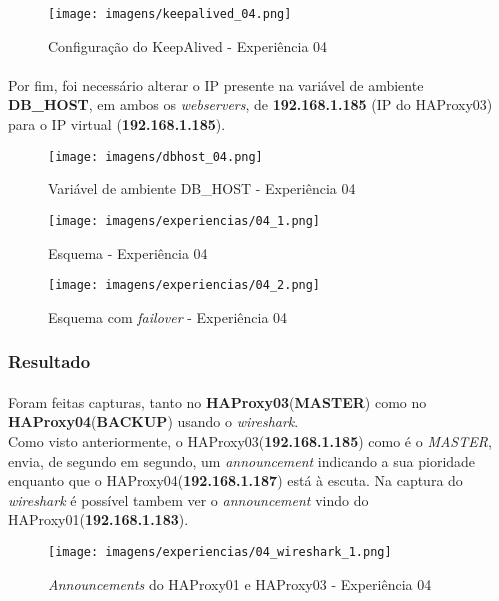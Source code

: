 \documentclass{report}
\begin{document}
\begin{figure}[H]
\center
\texttt{[image: imagens/keepalived\_04.png]}
\caption{Configuração do KeepAlived - Experiência 04}
\label{fig.nav}
\end{figure}


\paragraph{}
Por fim, foi necessário alterar o IP presente na variável de ambiente \textbf{DB\_HOST}, em ambos os \emph{webservers},
de \textbf{192.168.1.185} (IP do HAProxy03) para o IP virtual (\textbf{192.168.1.185}).

\begin{figure}[H]
\center
\texttt{[image: imagens/dbhost\_04.png]}
\caption{Variável de ambiente DB\_HOST - Experiência 04}
\label{fig.nav}
\end{figure}


\begin{figure}[H]
\center
\texttt{[image: imagens/experiencias/04\_1.png]}
\caption{Esquema - Experiência 04}
\label{fig.nav}
\end{figure}

\begin{figure}[H]
\center
\texttt{[image: imagens/experiencias/04\_2.png]}
\caption{Esquema com \emph{failover} - Experiência 04}
\label{fig.nav}
\end{figure}


\subsubsection{Resultado}
\paragraph{}
Foram feitas capturas, tanto no \textbf{HAProxy03}(\textbf{MASTER}) como no \textbf{HAProxy04}(\textbf{BACKUP})
usando o \emph{wireshark}.\\
Como visto anteriormente, o HAProxy03(\textbf{192.168.1.185}) como é o \emph{MASTER}, envia, de segundo em segundo, um \emph{announcement} indicando a sua pioridade enquanto que o HAProxy04(\textbf{192.168.1.187}) está à escuta.
Na captura do \emph{wireshark} é possível tambem ver o \emph{announcement} vindo do HAProxy01(\textbf{192.168.1.183}).

\begin{figure}[H]
\center
\texttt{[image: imagens/experiencias/04\_wireshark\_1.png]}
\caption{\emph{Announcements} do HAProxy01 e HAProxy03 - Experiência 04}
\label{fig.nav}
\end{figure}
\end{document}

